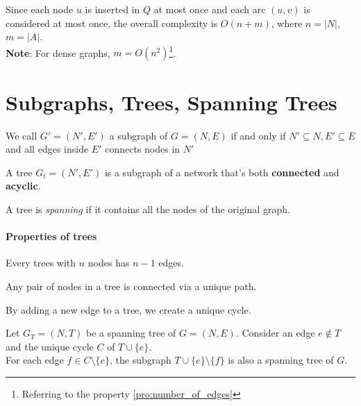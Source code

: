             Since each node $u$ is inserted in $Q$ at most once and each arc $(u, v)$ is considered at most once, the overall complexity is
            $O(n + m)$, where $n = |N|$, $m = |A|$.\\
            \textbf{Note}: For dense graphs, $m = O(n^2)$\footnote{Referring to the property \ref{pro:number_of_edges}}.
    \section{Subgraphs, Trees, Spanning Trees}
        \begin{definition}[Subgraph]
            We call $G' = (N', E')$ a subgraph of $G = (N, E)$ if and only if $N' \subseteq N, E' \subseteq E$ and all edges inside $E'$ connects nodes in $N'$
        \end{definition}
        
        \begin{definition}[Tree]
            A tree $G_t = (N', E')$ is a subgraph of a network that's both \textbf{connected} and \textbf{acyclic}.
        \end{definition}

        \begin{definition}
            A tree is \emph{spanning} if it contains all the nodes of the original graph.
        \end{definition}

        \paragraph*{Properties of trees}
        \begin{property}
            Every trees with $n$ nodes has $n-1$ edges.
        \end{property}
        \begin{property}
            Any pair of nodes in a tree is connected via a unique path.
        \end{property}
        \begin{property}
            By adding a new edge to a tree, we create a unique cycle.
        \end{property}
        \begin{property}
            Let $G_T = (N, T)$ be a spanning tree of $G = (N, E)$. Consider an edge $e \notin T$ and the unique cycle $C$ of $T \cup\{e\}$.\\
            For each edge $f \in C\setminus\{e\}$, the subgraph $T \cup \{e\}\setminus\{f\}$ is also a spanning tree of $G$.
        \end{property}
        


